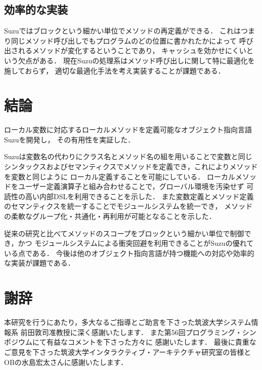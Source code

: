 \documentclass[a4paper,11pt,dvipdfmx]{jreport}
\begin{document}
\section{効率的な実装}

Suzuではブロックという細かい単位でメソッドの再定義ができる．
これはつまり同じメソッド呼び出しでもプログラムのどの位置に書かれたかによって
呼び出されるメソッドが変化するということであり，
キャッシュを効かせにくいという欠点がある．
現在Suzuの処理系はメソッド呼び出しに関して特に最適化を施しておらず，
適切な最適化手法を考え実装することが課題である．


\chapter{結論}
\label{chapter:conclusion}

ローカル変数に対応するローカルメソッドを定義可能なオブジェクト指向言語Suzuを開発し，
その有用性を実証した．

Suzuは変数名の代わりにクラス名とメソッド名の組を用いることで変数と同じ
シンタックスおよびセマンティクスでメソッドを定義でき，これによりメソッドを変数と同じように
ローカル定義することを可能にしている．
ローカルメソッドをユーザー定義演算子と組み合わせることで，グローバル環境を汚染せず
可読性の高い内部DSLを利用できることを示した．
また変数定義とメソッド定義のセマンティクスを統一することでモジュールシステムを統一でき，
メソッドの柔軟なグループ化・共通化・再利用が可能となることを示した．

従来の研究と比べてメソッドのスコープをブロックという細かい単位で制御でき，かつ
モジュールシステムによる衝突回避を利用できることがSuzuの優れている点である．
今後は他のオブジェクト指向言語が持つ機能への対応や効率的な実装が課題である．


\chapter*{謝辞}

本研究を行うにあたり，多大なるご指導とご助言を下さった筑波大学システム情報系
前田敦司准教授に深く感謝いたします．
また第56回プログラミング・シンポジウムにて有益なコメントを下さった方々に
感謝いたします．
最後に貴重なご意見を下さった筑波大学インタラクティブ・アーキテクチャ研究室の皆様と
OBの水島宏太さんに感謝いたします．

\newpage

\nocite{Java}
\nocite{ContextJ}
\nocite{C3Linearization}
\nocite{CISCO}
\nocite{OptimizingMessageSends}
\nocite{MethodCachingForRuby}
\nocite{ShiftResetTutorial}
\nocite{ShiftResetOnMinCaml}
\nocite{ExnAndDelimCont}
\renewcommand{\bibname}{参考文献}
\end{document}
